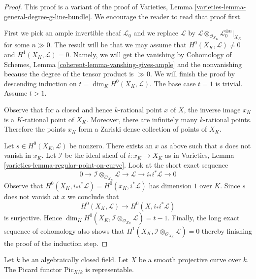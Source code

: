 \begin{proof}
This proof is a variant of the proof of
Varieties, Lemma \ref{varieties-lemma-general-degree-g-line-bundle}.
We encourage the reader to read that proof first.

\medskip\noindent
First we pick an ample invertible sheaf $\mathcal{L}_0$ and
we replace $\mathcal{L}$ by
$\mathcal{L} \otimes_{\mathcal{O}_{X_K}} \mathcal{L}_0^{\otimes n}|_{X_K}$
for some $n \gg 0$. The result will be that we may assume that
$H^0(X_K, \mathcal{L}) \not = 0$ and $H^1(X_K, \mathcal{L}) = 0$.
Namely, we will get the vanishing by Cohomology of Schemes, Lemma
\ref{coherent-lemma-vanshing-gives-ample} and the nonvanishing because
the degree of the tensor product is $\gg 0$.
We will finish the proof by descending induction on
$t = \dim_K H^0(X_K, \mathcal{L})$. The base case $t = 1$ is trivial.
Assume $t > 1$.

\medskip\noindent
Observe that for a closed and hence $k$-rational point $x$
of $X$, the inverse image $x_K$ is a $K$-rational point of $X_K$.
Moreover, there are infinitely many $k$-rational points. Therefore
the points $x_K$ form a Zariski dense collection of points of $X_K$.

\medskip\noindent
Let $s \in H^0(X_K, \mathcal{L})$ be nonzero. There exists an $x$
as above such that $s$ does not vanish in $x_K$. Let $\mathcal{I}$
be the ideal sheaf of $i : x_K \to X_K$ as in
Varieties, Lemma \ref{varieties-lemma-regular-point-on-curve}. Look at the
short exact sequence
$$
0 \to \mathcal{I} \otimes_{\mathcal{O}_{X_K}} \mathcal{L} \to
\mathcal{L} \to i_*i^*\mathcal{L} \to 0
$$
Observe that $H^0(X_K, i_*i^*\mathcal{L}) = H^0(x_K, i^*\mathcal{L})$
has dimension $1$ over $K$. Since $s$ does not vanish at $x$ we conclude that
$$
H^0(X_K, \mathcal{L}) \longrightarrow H^0(X, i_*i^*\mathcal{L})
$$
is surjective. Hence
$\dim_K H^0(X_K, \mathcal{I} \otimes_{\mathcal{O}_{X_K}} \mathcal{L}) = t - 1$.
Finally, the long exact sequence of cohomology also shows that
$H^1(X_K, \mathcal{I} \otimes_{\mathcal{O}_{X_K}} \mathcal{L}) = 0$
thereby finishing the proof of the induction step.
\end{proof}

\begin{proposition}
\label{proposition-pic-curve}
Let $k$ be an algebraically closed field. Let $X$ be a smooth projective
curve over $k$. The Picard functor $\text{Pic}_{X/k}$ is representable.
\end{proposition}

